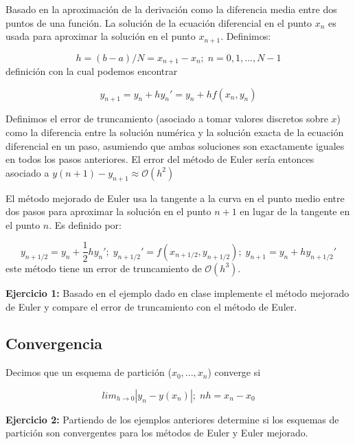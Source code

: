\documentclass[10.5pt]{article}
\begin{document}
Basado en la aproximación de la derivación como la diferencia media entre dos puntos de una función. La solución de la ecuación diferencial en el punto $x_{n}$ es usada para aproximar la solución en el punto $x_{n+1}$. Definimos:

\begin{equation}
h=(b-a)/N=x_{n+1}-x_{n};\; n=0,1,...,N-1
\end{equation} definición con la cual podemos encontrar 

\begin{equation}
y_{n+1}=y_{n}+hy_{n}'=y_{n}+hf(x_{n},y_{n})
\end{equation}

Definimos el error de truncamiento (asociado a tomar valores discretos sobre $x$) como la diferencia entre la solución numérica y la solución exacta de la ecuación diferencial en un paso, asumiendo que ambas soluciones son exactamente iguales en todos los pasos anteriores. El error del método de Euler sería entonces asociado a $y(n+1)-y_{n+1}\approx \mathcal{O}(h^{2})$

El método mejorado de Euler usa la tangente a la curva en el punto medio entre dos pasos para aproximar la solución en el punto $n+1$ en lugar de la tangente en el punto $n$. Es definido por:

\begin{equation}
y_{n+1/2}=y_{n}+\frac{1}{2}hy_{n}';\; y_{n+1/2}'=f(x_{n+1/2},y_{n+1/2});\; y_{n+1}=y_{n}+hy_{n+1/2}'
\end{equation} este método tiene un error de truncamiento de $\mathcal{O}(h^{3})$. 

{\bf Ejercicio 1:} Basado en el ejemplo dado en clase implemente el método mejorado de Euler y compare el error de truncamiento con el método de Euler.

\subsection{Convergencia}

Decimos que un esquema de partición ($x_{0},...,x_{n}$) converge si

\begin{equation}
lim_{h\rightarrow 0}|y_{n}-y(x_{n})|;\; nh=x_{n}-x_{0}
\end{equation}

{\bf Ejercicio 2:} Partiendo de los ejemplos anteriores determine si los esquemas de partición son convergentes para los métodos de Euler y Euler mejorado.
\end{document}
